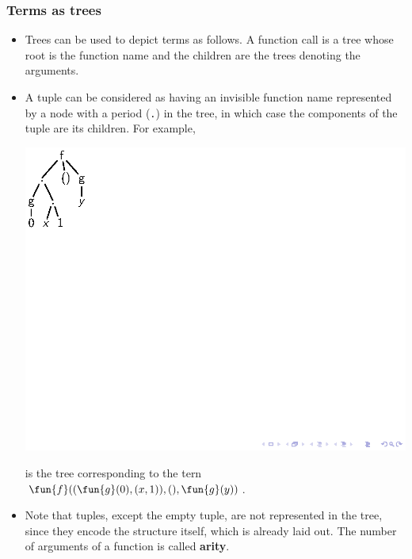 \documentclass[compress,dvips,xcolor={dvipsnames},t]{beamer}
\begin{document}
\begin{frame}
  \frametitle{Terms as trees}

  \begin{itemize}

    \item Trees can be used to depict terms as follows. A function
      call is a tree whose root is the function name and the children
      are the trees denoting the arguments.

    \item A tuple can be considered as having an invisible function
      name represented by a node with a period (\texttt{.}) in the
      tree, in which case the components of the tuple are its
      children. For example,
      \begin{center}
        \includegraphics[bb=25 715 80 788]{tree}
      \end{center}
      is the tree corresponding to the tern
      \(\fun{f}((\fun{g}(0),(x,1)),(),\fun{g}(y))\).

    \item Note that tuples, except the empty tuple, are not
      represented in the tree, since they encode the structure itself,
      which is already laid out. The number of arguments of a function
      is called \textbf{arity}.

  \end{itemize}

\end{frame}
\end{document}

